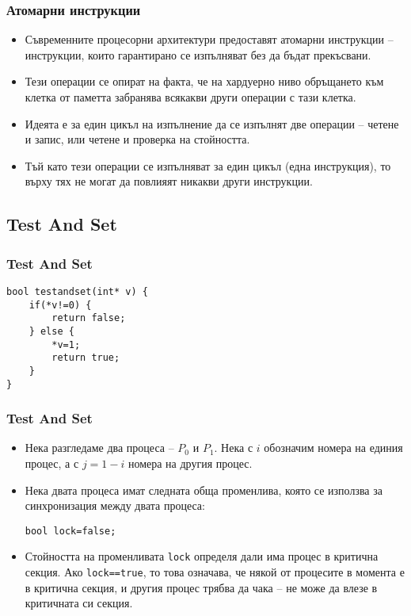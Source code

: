 \documentclass[ignorenonframetext, hyperref=unicode]{beamer}
\begin{document}
\begin{frame}[containsverbatim]
\frametitle{Атомарни инструкции}
\begin{itemize}
\item  Съвременните процесорни архитектури предоставят атомарни инструкции --
инструкции, които гарантирано се изпълняват без да бъдат прекъсвани.
\item Тези операции се опират на факта, че на хардуерно ниво обръщането към
клетка от паметта забранява всякакви други операции с тази клетка.
\item Идеята е за един цикъл на изпълнение да се изпълнят две
операции -- четене и запис, или четене и проверка на стойността.
\item Тъй като тези операции се изпълняват за един цикъл (една инструкция), то
върху тях не могат да повлияят никакви други инструкции.
\end{itemize}
\end{frame}

\subsection{Test And Set}
\begin{frame}[containsverbatim]
\frametitle{Test And Set}

\begin{lstlisting}
bool testandset(int* v) {
	if(*v!=0) {
		return false;
	} else {
		*v=1;
		return true;
	}
}
\end{lstlisting}
\end{frame}

\begin{frame}[containsverbatim]
\frametitle{Test And Set}
\begin{itemize}
\item Нека разгледаме два процеса -- $P_0$ и $P_1$. Нека с $i$ обозначим
  номера на единия процес, а с $j=1-i$ номера на другия процес.
\item Нека двата процеса имат следната обща променлива, която се използва за
синхронизация между двата процеса: 
\begin{lstlisting}[numbers=none]
bool lock=false;
\end{lstlisting}
\item Стойността на променливата \lstinline{lock} определя дали има процес в
критична секция. Ако \lstinline{lock==true}, то това означава, че някой от
процесите в момента е в критична секция, и другия процес трябва да чака -- не
може да влезе в критичната си секция.
\end{itemize}
\end{frame}
\end{document}
